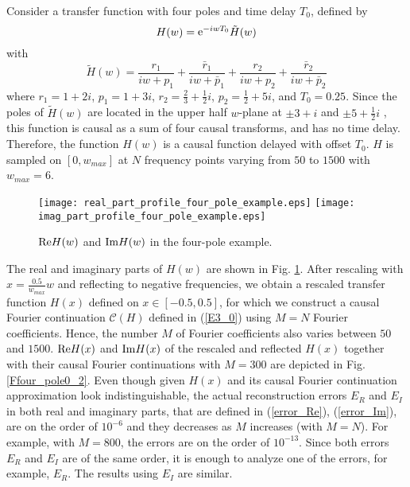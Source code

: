 \documentclass[journal,twoside]{IEEEtran}
\begin{document}
Consider a transfer function with four poles and time delay $T_0$, defined by
\begin{equation} \label{Exfour_pole1}
H(w)={\mathop{\rm e}\nolimits}^{-iwT_0} \tilde H(w)
\end{equation}
with
\[
\tilde H(w)=\frac{r_1}{iw+p_1}+\frac{\bar r_1}{iw+\bar p_1}+\frac{r_2}{iw+p_2}+\frac{\bar r_2}{iw+\bar p_2} 
\]
where $r_1=1+2i$, $p_1=1+3i$, $r_2=\frac 23+\frac 12 i$, $p_2=\frac 12+5i$, and  $T_0=0.25$. Since the poles of $ \tilde H(w)$  are located in the upper half $w$-plane at $\pm 3+i$  and $\pm 5+\frac 12 i$ , this function is causal as a sum of four causal transforms, and has no time delay. Therefore, the function $H(w)$ is a  causal function delayed with offset $T_0$.
$H$ is sampled on $[0,w_{max}]$ at $N$ frequency points varying from $50$ to $1500$ with $w_{max}=6$.
\begin{figure}[h] \begin{center}
\texttt{[image: real\_part\_profile\_four\_pole\_example.eps]}
\hspace{10pt}
\texttt{[image: imag\_part\_profile\_four\_pole\_example.eps]}
\end{center}
\caption{${\mathop{\rm Re}\nolimits} H(w)$ and ${\mathop{\rm Im}\nolimits} H(w)$ in the four-pole example.} 
\label{Ffour_pole0}
\end{figure}
The real and imaginary parts of $H(w)$ are shown in Fig. \ref{Ffour_pole0}. After rescaling with  $x=\frac{0.5}{w_{max}}w$ and reflecting to negative frequencies, we obtain a rescaled  transfer function $H(x)$  defined on  $x\in[-0.5, 0.5]$, for which we construct a causal Fourier continuation ${\mathcal C}(H)$ defined in (\ref{E3_0}) using $M=N$ Fourier coefficients. 
Hence, the number $M$ of Fourier coefficients also varies between $50$ and $1500$. ${\mathop{\rm Re}\nolimits} H(x)$    and ${\mathop{\rm Im}\nolimits} H(x)$ of the rescaled and reflected $H(x)$ together with their causal Fourier continuations with $M=300$ are  depicted in Fig. \ref{Ffour_pole0_2}. Even though given $H(x)$ and its causal Fourier continuation approximation look indistinguishable, the actual reconstruction errors $E_R$ and $E_I$ in both real and imaginary parts, that are defined in (\ref{error_Re}), (\ref{error_Im}),   are on the order of $10^{-6}$ and they decreases as $M$ increases (with $M=N$). For example, with $M=800$, the errors are on the order of $10^{-13}$. Since both errors $E_R$ and $E_I$ are of the same order, it is enough to analyze one of the errors, for example,  $E_R$. The results using  $E_I$ are similar.
\end{document}
